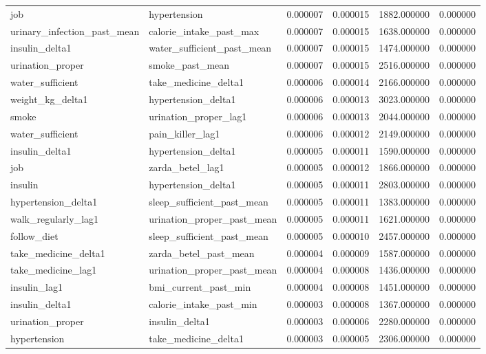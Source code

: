 \begin{longtable}{llrrrr}
job & hypertension & 0.000007 & 0.000015 & 1882.000000 & 0.000000 \\
urinary\_infection\_past\_mean & calorie\_intake\_past\_max & 0.000007 & 0.000015 & 1638.000000 & 0.000000 \\
insulin\_delta1 & water\_sufficient\_past\_mean & 0.000007 & 0.000015 & 1474.000000 & 0.000000 \\
urination\_proper & smoke\_past\_mean & 0.000007 & 0.000015 & 2516.000000 & 0.000000 \\
water\_sufficient & take\_medicine\_delta1 & 0.000006 & 0.000014 & 2166.000000 & 0.000000 \\
weight\_kg\_delta1 & hypertension\_delta1 & 0.000006 & 0.000013 & 3023.000000 & 0.000000 \\
smoke & urination\_proper\_lag1 & 0.000006 & 0.000013 & 2044.000000 & 0.000000 \\
water\_sufficient & pain\_killer\_lag1 & 0.000006 & 0.000012 & 2149.000000 & 0.000000 \\
insulin\_delta1 & hypertension\_delta1 & 0.000005 & 0.000011 & 1590.000000 & 0.000000 \\
job & zarda\_betel\_lag1 & 0.000005 & 0.000012 & 1866.000000 & 0.000000 \\
insulin & hypertension\_delta1 & 0.000005 & 0.000011 & 2803.000000 & 0.000000 \\
hypertension\_delta1 & sleep\_sufficient\_past\_mean & 0.000005 & 0.000011 & 1383.000000 & 0.000000 \\
walk\_regularly\_lag1 & urination\_proper\_past\_mean & 0.000005 & 0.000011 & 1621.000000 & 0.000000 \\
follow\_diet & sleep\_sufficient\_past\_mean & 0.000005 & 0.000010 & 2457.000000 & 0.000000 \\
take\_medicine\_delta1 & zarda\_betel\_past\_mean & 0.000004 & 0.000009 & 1587.000000 & 0.000000 \\
take\_medicine\_lag1 & urination\_proper\_past\_mean & 0.000004 & 0.000008 & 1436.000000 & 0.000000 \\
insulin\_lag1 & bmi\_current\_past\_min & 0.000004 & 0.000008 & 1451.000000 & 0.000000 \\
insulin\_delta1 & calorie\_intake\_past\_min & 0.000003 & 0.000008 & 1367.000000 & 0.000000 \\
urination\_proper & insulin\_delta1 & 0.000003 & 0.000006 & 2280.000000 & 0.000000 \\
hypertension & take\_medicine\_delta1 & 0.000003 & 0.000005 & 2306.000000 & 0.000000 \\

\end{longtable}
